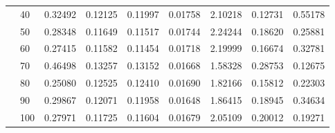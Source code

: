 \begin{table}[!htbp]
\begin{tabular}{llrrrrrrr}
 & 40 & 0.32492 & 0.12125 & 0.11997 & 0.01758 & 2.10218 & 0.12731 & 0.55178 \\
 & 50 & 0.28348 & 0.11649 & 0.11517 & 0.01744 & 2.24244 & 0.18620 & 0.25881 \\
 & 60 & 0.27415 & 0.11582 & 0.11454 & 0.01718 & 2.19999 & 0.16674 & 0.32781 \\
 & 70 & 0.46498 & 0.13257 & 0.13152 & 0.01668 & 1.58328 & 0.28753 & 0.12675 \\
 & 80 & 0.25080 & 0.12525 & 0.12410 & 0.01690 & 1.82166 & 0.15812 & 0.22303 \\
 & 90 & 0.29867 & 0.12071 & 0.11958 & 0.01648 & 1.86415 & 0.18945 & 0.34634 \\
 & 100 & 0.27971 & 0.11725 & 0.11604 & 0.01679 & 2.05109 & 0.20012 & 0.19271 \\
\bottomrule
\end{tabular}
\end{table}
